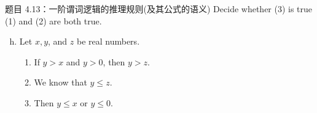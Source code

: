 \begin{frame}{}
  \begin{exampleblock}{题目 4.13：一阶谓词逻辑的推理规则(及其公式的语义)}
    Decide whether (3) is true  (1) and (2) are both true.

    \begin{enumerate}[(a)]
      \setcounter{enumi}{7}
      \item Let $x,y$, and $z$ be real numbers.
	\begin{enumerate}[(1)]
	  \item If $y > x$ and $y > 0$, then $y > z$.
	  \item We know that $y \le z$.
	  \item Then $y \le x$ or $y \le 0$.
	\end{enumerate}
    \end{enumerate}
  \end{exampleblock}
\end{frame}

